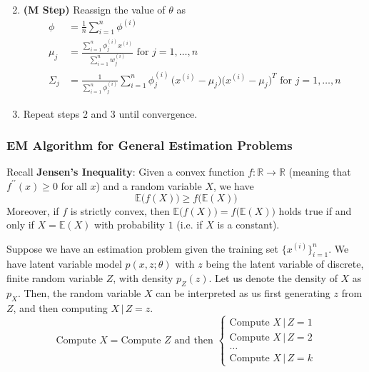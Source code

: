 \documentclass{article}
\begin{document}
\begin{definition}
\begin{enumerate}
\begin{align*}
            \end{align*}
          \item \textbf{(M Step)} Reassign the value of $\theta$ as 
            \begin{align*} 
              \phi & = \frac{1}{n} \sum_{i=1}^n \phi^{(i)} \\
              \mu_j & = \frac{\sum_{i=1}^n \phi_j^{(i)} x^{(i)}}{\sum_{i=1}^n w_j^{(i)}} \text{ for } j = 1, \ldots, n \\
              \Sigma_j & = \frac{1}{\sum_{i=1}^n \phi_j^{(i)}} \sum_{i=1}^n \phi^{(i)}_j \, \big(x^{(i)} - \mu_j \big) \big(x^{(i)} - \mu_j\big)^T \text{ for } j = 1, \ldots, n 
            \end{align*}
          \item Repeat steps 2 and 3 until convergence.
        \end{enumerate}
      \end{definition}

    \subsubsection{EM Algorithm for General Estimation Problems}

      Recall \textbf{Jensen's Inequality}: Given a convex function $f: \mathbb{R} \longrightarrow \mathbb{R}$ (meaning that $f^{\prime\prime} (x) \geq 0$ for all $x$) and a random variable $X$, we have 
      \[\mathbb{E}\big(f(X)\big) \geq f\big(\mathbb{E}(X)\big) \]
      Moreover, if $f$ is strictly convex, then $\mathbb{E}\big( f(X)\big) = f\big(\mathbb{E}(X)\big)$ holds true if and only if $X = \mathbb{E}(X)$ with probability $1$ (i.e. if $X$ is a constant). 

      Suppose we have an estimation problem given the training set $\{x^{(i)}\}_{i=1}^n$. We have latent variable model $p(x, z; \theta)$ with $z$ being the latent variable of discrete, finite random variable $Z$, with density $p_Z (z)$. Let us denote the density of $X$ as $p_X$. Then, the random variable $X$ can be interpreted as us first generating $z$ from $Z$, and then computing $X\,|\,Z = z$.  
      \[\text{Compute } X = \text{Compute } Z \text{ and then } \begin{cases} 
      \text{Compute } X \,|\, Z = 1 \\
      \text{Compute } X \,|\, Z = 2 \\
      \ldots \\
      \text{Compute } X \,|\, Z = k
      \end{cases}\]
\end{document}
